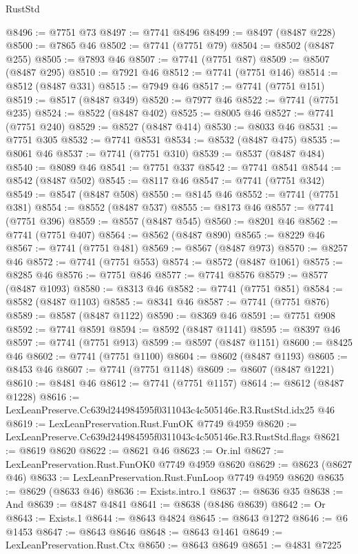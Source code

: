 \begin{lexlean}{RustStd}
\begin{coremodule}
@8496 := @7751 @73
@8497 := @7741 @8496
@8499 := @8497 (@8487 @228)
@8500 := @7865 @46
@8502 := @7741 (@7751 @79)
@8504 := @8502 (@8487 @255)
@8505 := @7893 @46
@8507 := @7741 (@7751 @87)
@8509 := @8507 (@8487 @295)
@8510 := @7921 @46
@8512 := @7741 (@7751 @146)
@8514 := @8512 (@8487 @331)
@8515 := @7949 @46
@8517 := @7741 (@7751 @151)
@8519 := @8517 (@8487 @349)
@8520 := @7977 @46
@8522 := @7741 (@7751 @235)
@8524 := @8522 (@8487 @402)
@8525 := @8005 @46
@8527 := @7741 (@7751 @240)
@8529 := @8527 (@8487 @414)
@8530 := @8033 @46
@8531 := @7751 @305
@8532 := @7741 @8531
@8534 := @8532 (@8487 @475)
@8535 := @8061 @46
@8537 := @7741 (@7751 @310)
@8539 := @8537 (@8487 @484)
@8540 := @8089 @46
@8541 := @7751 @337
@8542 := @7741 @8541
@8544 := @8542 (@8487 @502)
@8545 := @8117 @46
@8547 := @7741 (@7751 @342)
@8549 := @8547 (@8487 @508)
@8550 := @8145 @46
@8552 := @7741 (@7751 @381)
@8554 := @8552 (@8487 @537)
@8555 := @8173 @46
@8557 := @7741 (@7751 @396)
@8559 := @8557 (@8487 @545)
@8560 := @8201 @46
@8562 := @7741 (@7751 @407)
@8564 := @8562 (@8487 @890)
@8565 := @8229 @46
@8567 := @7741 (@7751 @481)
@8569 := @8567 (@8487 @973)
@8570 := @8257 @46
@8572 := @7741 (@7751 @553)
@8574 := @8572 (@8487 @1061)
@8575 := @8285 @46
@8576 := @7751 @846
@8577 := @7741 @8576
@8579 := @8577 (@8487 @1093)
@8580 := @8313 @46
@8582 := @7741 (@7751 @851)
@8584 := @8582 (@8487 @1103)
@8585 := @8341 @46
@8587 := @7741 (@7751 @876)
@8589 := @8587 (@8487 @1122)
@8590 := @8369 @46
@8591 := @7751 @908
@8592 := @7741 @8591
@8594 := @8592 (@8487 @1141)
@8595 := @8397 @46
@8597 := @7741 (@7751 @913)
@8599 := @8597 (@8487 @1151)
@8600 := @8425 @46
@8602 := @7741 (@7751 @1100)
@8604 := @8602 (@8487 @1193)
@8605 := @8453 @46
@8607 := @7741 (@7751 @1148)
@8609 := @8607 (@8487 @1221)
@8610 := @8481 @46
@8612 := @7741 (@7751 @1157)
@8614 := @8612 (@8487 @1228)
@8616 := LexLeanPreserve.Cc639d244984595f0311043c4c505146e.R3.RustStd.idx25 @46
@8619 := LexLeanPreservation.Rust.FunOK @7749 @4959
@8620 := LexLeanPreserve.Cc639d244984595f0311043c4c505146e.R3.RustStd.flags
@8621 := @8619 @8620
@8622 := @8621 @46
@8623 := Or.inl
@8627 := LexLeanPreservation.Rust.FunOK0 @7749 @4959 @8620
@8629 := @8623 (@8627 @46)
@8633 := LexLeanPreservation.Rust.FunLoop @7749 @4959 @8620
@8635 := @8629 (@8633 @46)
@8636 := Exists.intro.{1}
@8637 := @8636 @35
@8638 := And
@8639 := @8487 @4841
@8641 := @8638 (@8486 @8639)
@8642 := Or
@8643 := Exists.{1}
@8644 := @8643 @4824
@8645 := @8643 @1272
@8646 := @6 @1453
@8647 := @8643 @8646
@8648 := @8643 @1461
@8649 := LexLeanPreservation.Rust.Ctx
@8650 := @8643 @8649
@8651 := @4831 @7225

\end{coremodule}
\end{lexlean}

